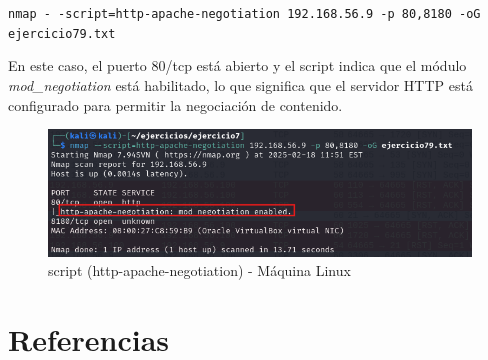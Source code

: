\documentclass[a4paper,12pt]{article} %
\begin{document}
    \begin{center}
    \texttt{nmap - -script=http-apache-negotiation 192.168.56.9 -p 80,8180 -oG ejercicio79.txt}
    \end{center}

    En este caso, el puerto 80/tcp está abierto y el script indica que el módulo \textit{mod\_negotiation} está habilitado, lo que significa que el servidor HTTP está configurado para permitir la negociación de contenido. 

        \begin{figure} [hp!]
         \centering
         \includegraphics[width=1\textwidth]{Imagenes/eje7L.png}
         \caption{script (http-apache-negotiation) - Máquina Linux}
         \label{fig:eje6Linux}
        \end{figure}
        
\section{Referencias}
\printbibliography[heading=none]
\end{document}
